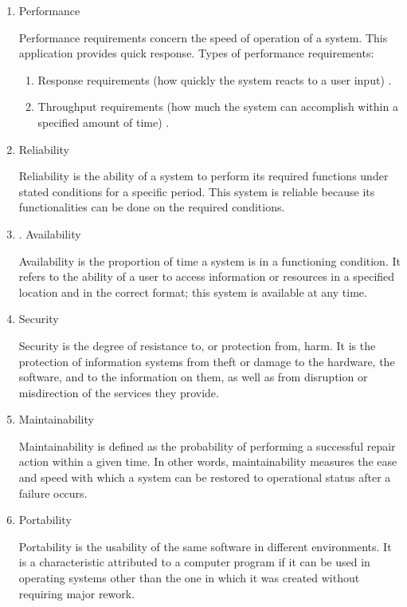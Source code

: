 \begin{enumerate}
\item Performance

Performance requirements concern the speed of operation of a system. This application provides quick response. Types of performance requirements: 
\begin{enumerate}
\item Response requirements (how quickly the system reacts to a user input) .
\item Throughput requirements (how much the system can accomplish within a specified amount of time) .

\end{enumerate}

\item
 Reliability

Reliability is the ability of a system to perform its required functions under stated conditions for a specific period. This system is reliable because its functionalities can be done on the required conditions. 

\item . Availability 

Availability is the proportion of time a system is in a functioning condition. It refers to the ability of a user to access information or resources in a specified location and in the correct format; this system is available at any time.

\item Security

Security is the degree of resistance to, or protection from, harm. It is the protection of information systems from theft or damage to the hardware, the software, and to the information on them, as well as from disruption or misdirection of the services they provide. 

\item Maintainability 

Maintainability is defined as the probability of performing a successful repair action within a given time. In other words, maintainability measures the ease and speed with which a system can be restored to operational status after a failure occurs.

\item Portability

Portability is the usability of the same software in different environments. It is a characteristic attributed to a computer program if it can be used in operating systems other than the one in which it was created without requiring major rework. 

\end{enumerate}
%
